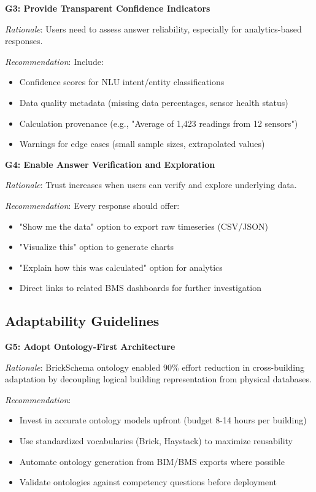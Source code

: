 \documentclass[acmlarge]{acmart}
\begin{document}
\textbf{G3: Provide Transparent Confidence Indicators}

\textit{Rationale}: Users need to assess answer reliability, especially for analytics-based responses.

\textit{Recommendation}: Include:
\begin{itemize}
    \item Confidence scores for NLU intent/entity classifications
    \item Data quality metadata (missing data percentages, sensor health status)
    \item Calculation provenance (e.g., "Average of 1,423 readings from 12 sensors")
    \item Warnings for edge cases (small sample sizes, extrapolated values)
\end{itemize}

\textbf{G4: Enable Answer Verification and Exploration}

\textit{Rationale}: Trust increases when users can verify and explore underlying data.

\textit{Recommendation}: Every response should offer:
\begin{itemize}
    \item "Show me the data" option to export raw timeseries (CSV/JSON)
    \item "Visualize this" option to generate charts
    \item "Explain how this was calculated" option for analytics
    \item Direct links to related BMS dashboards for further investigation
\end{itemize}

\subsection{Adaptability Guidelines}

\textbf{G5: Adopt Ontology-First Architecture}

\textit{Rationale}: BrickSchema ontology enabled 90\% effort reduction in cross-building adaptation by decoupling logical building representation from physical databases.

\textit{Recommendation}:
\begin{itemize}
    \item Invest in accurate ontology models upfront (budget 8-14 hours per building)
    \item Use standardized vocabularies (Brick, Haystack) to maximize reusability
    \item Automate ontology generation from BIM/BMS exports where possible
    \item Validate ontologies against competency questions before deployment
\end{itemize}
\end{document}
